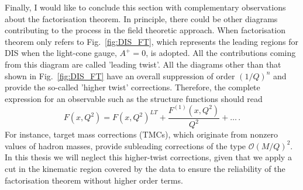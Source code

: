 Finally, I would like to conclude this section with complementary observations about the factorisation theorem. In principle, there could be other diagrams contributing to the process in the field theoretic approach. When factorisation theorem only refers to Fig.~\ref{fig:DIS_FT}, which represents the leading regions for DIS when the light-cone gauge, $A^{+}=0$, is adopted. All the contributions coming from this diagram are called 'leading twist'. All the diagrams other than that shown in Fig.~\ref{fig:DIS_FT} have an overall suppression of order $(1/Q)^{n}$ and provide the so-called 'higher twist' corrections. Therefore, the complete expression for an observable such as the structure functions should read
\begin{equation}
  F(x, Q^2) = F(x, Q^2)^{LT} + \frac{F^{(1)}(x,Q^2)}{Q^2} + \dots \,.
\end{equation}
For instance, target mass corrections (TMCs), which originate from nonzero values of hadron masses, provide subleading corrections of the type $\mathcal{O}(M/Q)^2$. In this thesis we will neglect this higher-twist corrections, given that we apply a cut in the kinematic region covered by the data to ensure the reliability of the factorisation theorem without higher order terms. 

